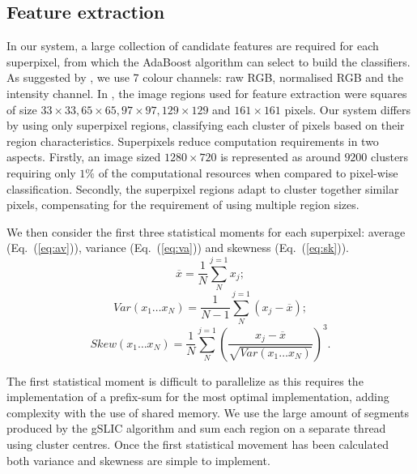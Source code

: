 \documentclass[twocolumn]{svjour3}          %
\begin{document}
\subsection{Feature extraction}
In our system, a large collection of candidate features are required for each superpixel, from which the AdaBoost algorithm can select to build the classifiers. As suggested by \cite{BM10}, we use 7 colour channels: raw RGB, normalised RGB and the intensity channel. In \cite{BM10}, the image regions used for feature extraction were squares of size $33\times33, 65\times65, 97\times97, 129\times129$ and $161\times161$ pixels. Our system differs by using only superpixel regions, classifying each cluster of pixels based on their region characteristics. Superpixels reduce computation requirements in two aspects. Firstly, an image sized $1280\times720$ is represented as around $9200$ clusters requiring only $1\%$ of the computational resources when compared to pixel-wise classification. Secondly, the superpixel regions adapt to cluster together similar pixels, compensating for the requirement of using multiple region sizes.

We then consider the first three statistical moments for each superpixel: average (Eq.~(\ref{eq:av})), variance (Eq.~(\ref{eq:va})) and skewness (Eq.~(\ref{eq:sk})). 
\begin{equation}
\overline{x}=\frac{1}{N}\sum_{N}^{j=1}x_j;
\label{eq:av}
\end{equation}
\begin{equation}
Var(x_1 \ldots x_N)=\frac{1}{N-1}\sum_{N}^{j=1}(x_j-\overline{x});
\label{eq:va}
\end{equation}	
\begin{equation}
Skew(x_1 \ldots x_N)=\frac{1}{N}\sum_{N}^{j=1}(\frac{x_j-\overline{x}}{\sqrt{Var(x_1 \ldots x_N)}})^3.
\label{eq:sk}
\end{equation}

The first statistical moment is difficult to parallelize as this requires the implementation of a prefix-sum for the most optimal implementation, adding complexity with the use of shared memory. We use the large amount of segments produced by the gSLIC algorithm and sum each region on a separate thread using cluster centres. Once the first statistical movement has been calculated both variance and skewness are simple to implement. 
\end{document}
